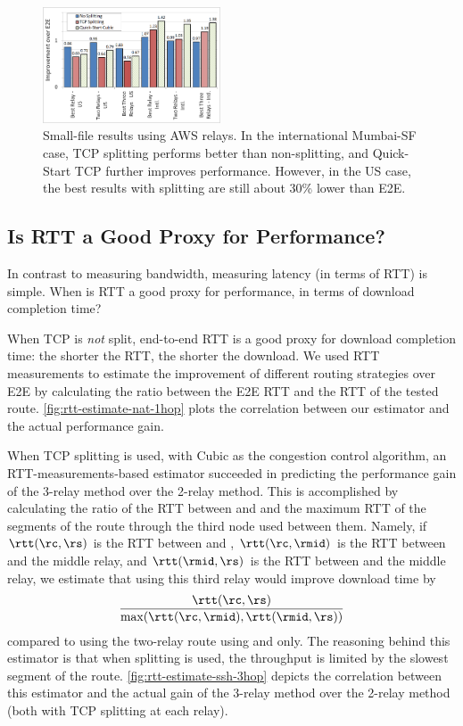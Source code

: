\documentclass[10pt,sigconf]{acmart}
\begin{document}
\begin{figure}[t]
  \centering
    \includegraphics[width=0.47\textwidth,trim=2mm 2mm 2mm 2mm,clip]{figures/small_file}
    \caption{Small-file results using AWS relays. In the international Mumbai-SF case, TCP splitting performs better than non-splitting, and Quick-Start TCP further improves performance. However, in the US case, the best  results with splitting are still about 30\% lower than E2E.}
    \label{fig:small-file}
\end{figure}

\subsection{Is RTT a Good Proxy for Performance?}

In contrast to measuring bandwidth, measuring latency (in terms of RTT) is simple. When is RTT a good proxy for performance, in terms of download completion time?

 When TCP is \emph{not} split, end-to-end RTT is a good proxy for download completion time: the shorter the RTT, the shorter the download. We used RTT measurements to estimate the improvement of different routing strategies over E2E by calculating the ratio between the E2E RTT and the RTT of the tested route. \autoref{fig:rtt-estimate-nat-1hop} plots the correlation between our estimator and the actual performance gain. %

 When TCP splitting is used, with Cubic as the congestion control algorithm, an RTT-measurements-based estimator succeeded in predicting the performance gain of the 3-relay method over the 2-relay method. This is accomplished by calculating the ratio of the RTT between \rc and \rs and the maximum RTT of the segments of the route through the third node used between them. Namely, if $\rtt(\rc,\rs)$ is the RTT between \rc and \rs, $\rtt(\rc,\rmid)$ is the RTT between \rc and the middle relay, and $\rtt(\rmid,\rs)$ is the RTT between \rs and the middle relay, we estimate that using this third relay would improve download time by 
\[
\frac{\rtt(\rc,\rs)}{\max(\rtt(\rc,\rmid),\rtt(\rmid,\rs))}
\]
compared to using the two-relay route using \rc and \rs only.
The reasoning behind this estimator is that when splitting is used, the throughput is limited by the slowest segment of the route. \autoref{fig:rtt-estimate-ssh-3hop} depicts the correlation between this estimator and the actual gain of the 3-relay method over the 2-relay method (both with TCP splitting at each relay).
\end{document}
